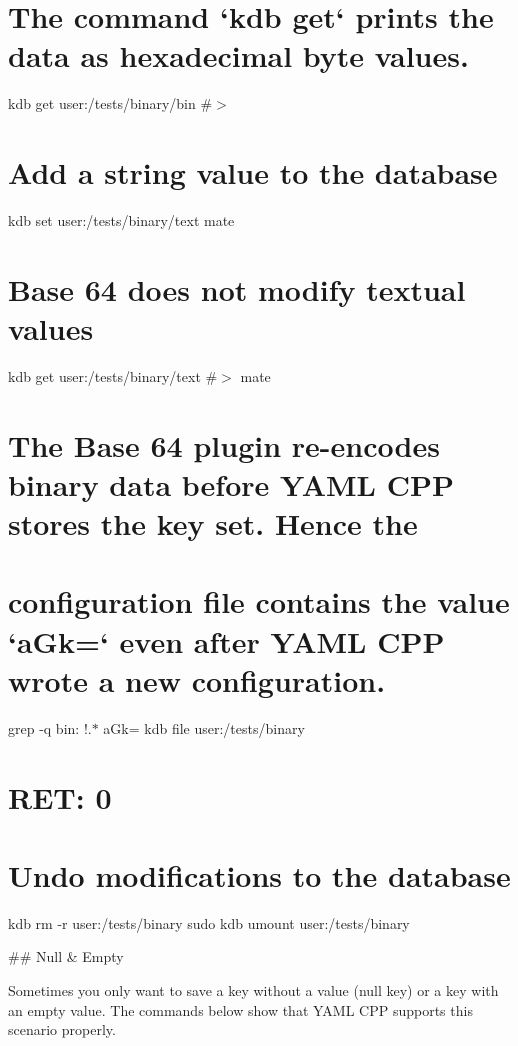 \hypertarget{autotoc_md817_autotoc_md874}{}\section{The command `kdb get` prints the data as hexadecimal byte values.}\label{autotoc_md817_autotoc_md874}
kdb get user\+:/tests/binary/bin \#$>$ \hypertarget{autotoc_md817_autotoc_md875}{}\section{Add a string value to the database}\label{autotoc_md817_autotoc_md875}
kdb set user\+:/tests/binary/text mate \hypertarget{autotoc_md817_autotoc_md876}{}\section{Base 64 does not modify textual values}\label{autotoc_md817_autotoc_md876}
kdb get user\+:/tests/binary/text \#$>$ mate\hypertarget{autotoc_md817_autotoc_md877}{}\section{The Base 64 plugin re-\/encodes binary data before Y\+A\+M\+L C\+P\+P stores the key set. Hence the}\label{autotoc_md817_autotoc_md877}
\hypertarget{autotoc_md817_autotoc_md878}{}\section{configuration file contains the value `a\+Gk=` even after Y\+A\+M\+L C\+P\+P wrote a new configuration.}\label{autotoc_md817_autotoc_md878}
grep -\/q \textquotesingle{}bin\+: !.$\ast$ a\+Gk=\textquotesingle{} {\ttfamily kdb file user\+:/tests/binary} \hypertarget{autotoc_md817_autotoc_md879}{}\section{R\+E\+T\+: 0}\label{autotoc_md817_autotoc_md879}
\hypertarget{autotoc_md817_autotoc_md880}{}\section{Undo modifications to the database}\label{autotoc_md817_autotoc_md880}
kdb rm -\/r user\+:/tests/binary sudo kdb umount user\+:/tests/binary 
\begin{DoxyCode}
## Null & Empty

Sometimes you only want to save a key without a value (null key) or a key with an empty value. The commands
       below show that YAML CPP supports this scenario properly.
\end{DoxyCode}
